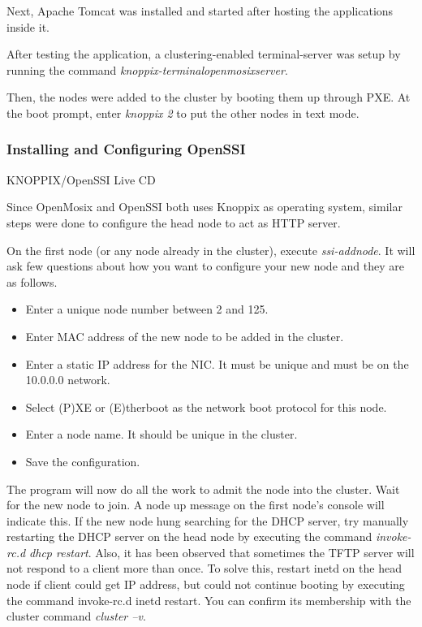 \documentclass[preprint]{acm_proc_article-sp}
\begin{document}
Next, Apache Tomcat was installed and started after hosting the applications inside it.

After testing the application, a clustering-enabled terminal-server was setup by running the command \emph{knoppix-terminalopenmosixserver}.

Then, the nodes were added to the cluster by booting them up through PXE. At the boot prompt, enter \emph{knoppix 2} to put the other nodes in text mode.

\subsubsection{Installing and Configuring OpenSSI}

KNOPPIX/OpenSSI Live CD

Since OpenMosix and OpenSSI both uses Knoppix as operating system, similar steps were done to configure the head node to act as HTTP server.

On the first node (or any node already in the cluster), execute \emph{ssi-addnode}. It will ask few questions about how you want to configure your new node and they are as follows.
\begin{itemize}
	\item Enter a unique node number between 2 and 125.
	\item Enter MAC address of the new node to be added in the cluster.
	\item Enter a static IP address for the NIC. It must be unique and must be on the 10.0.0.0 network.
	\item Select (P)XE or (E)therboot as the network boot protocol for this node.
	\item Enter a node name. It should be unique in the cluster. 
	\item Save the configuration.
\end{itemize}

The program will now do all the work to admit the node into the cluster. Wait for the new node to join. A node up message on the first node's console will indicate this. If the new node hung searching for the DHCP server, try manually restarting the DHCP server on the head node by executing the command \emph{invoke-rc.d dhcp restart}. Also, it has been observed that sometimes the TFTP server will not respond to a client more than once. To solve this, restart inetd on the head node if client could get IP address, but could not continue booting by executing the command invoke-rc.d inetd restart. You can confirm its membership with the cluster command \emph{cluster \---v}.
\end{document}
